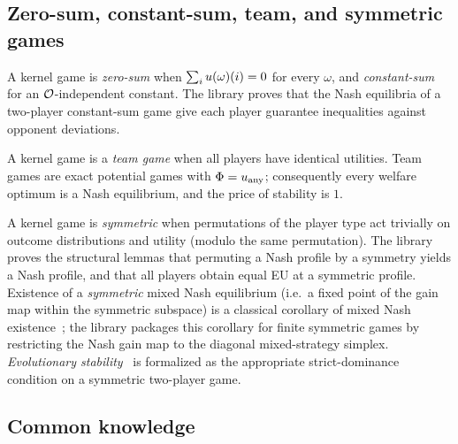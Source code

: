 \subsection{Zero-sum, constant-sum, team, and symmetric games}
\label{sec:solution-concepts:team}

A kernel game is \emph{zero-sum} when $\sum_i u(\omega)(i) =
0$ for every $\omega$, and \emph{constant-sum} for an
$\mathcal{O}$-independent constant.  The library proves that the
Nash equilibria of a two-player constant-sum game give each
player guarantee inequalities against opponent deviations.

A kernel game is a \emph{team game} when all players have
identical utilities.  Team games are exact potential games with
$\Phi = u_{\mathrm{any}}$; consequently every welfare optimum
is a Nash equilibrium, and the price of stability is $1$.

A kernel game is \emph{symmetric} when permutations of the player
type act trivially on outcome distributions and utility (modulo
the same permutation).  The library proves the structural lemmas
that permuting a Nash profile by a symmetry yields a Nash profile,
and that all players obtain equal EU at a symmetric profile.
Existence of a \emph{symmetric} mixed Nash equilibrium (i.e.\ a
fixed point of the gain map within the symmetric subspace) is a
classical corollary of mixed Nash existence~\citep{Nash1951}; the
library packages this corollary for finite symmetric games by
restricting the Nash gain map to the diagonal mixed-strategy
simplex.  \emph{Evolutionary
stability}~\citep{MaynardSmithPrice1973} is formalized as the
appropriate strict-dominance condition on a symmetric two-player
game.


\subsection{Common knowledge}
\label{sec:solution-concepts:common-knowledge}

